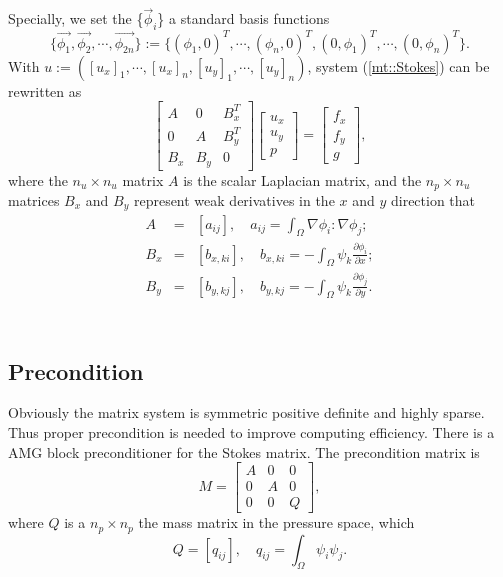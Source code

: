 \documentclass[a4paper]{article}
\begin{document}
Specially, we set the \{$\vec{\phi}_i$\} a standard basis functions
\begin{equation}
\{\vec{\phi_1},\vec{\phi_2},\cdots,\vec{\phi_{2n}} \}:=\{(\phi_1,0)^T,\cdots,(\phi_n,0)^T,(0,\phi_1)^T,\cdots,(0,\phi_n)^T\}.
\label{eq::basisfunction}
\end{equation}
With $u:=([u_x]_1,\cdots,[u_x]_n,[u_y]_1,\cdots,[u_y]_n)$, system (\ref{mt::Stokes}) can be rewritten as
\begin{equation}
\left[ \begin{array}{ccc}
A & 0 & B_x^T \\
0 & A & B_y^T \\
B_x & B_y & 0
\end{array}
\right]
\left[\begin{array}{ccc}
u_x\\
u_y\\
p
\end{array}
\right]=
\left[\begin{array}{ccc}
f_x\\
f_y\\
g
\end{array}
\right],
\label{Stokes}
\end{equation}
where the $n_u \times n_u $ matrix $A$ is the scalar Laplacian matrix, and the $n_p\times n_u$ matrices $B_x$ and $B_y$ represent weak derivatives in the $x$ and $y$ direction that 	
\begin{equation}
\begin{array}{rcl}
A &=& [a_{ij}], \quad a_{ij} = \int_{\Omega} \nabla \phi_i : \nabla \phi_j ;\\
B_x &=& [b_{x,ki}], \quad b_{x,ki} = -\int_{\Omega} \psi_k \frac{\partial \phi_i}{\partial x} ;\\
B_y &=& [b_{y,kj}], \quad b_{y,kj} = -\int_{\Omega} \psi_k \frac{\partial \phi_j}{\partial y} .\\
\end{array}
\label{Stokes-mtvalue}
\end{equation}
 \\
\subsection{Precondition}
Obviously the matrix system is symmetric positive definite and highly
sparse. Thus proper precondition is needed to improve computing
efficiency. There is a AMG block preconditioner for the Stokes
matrix. The precondition matrix is
\begin{equation}
M = \left[ \begin{array}{ccc}
A & 0 & 0 \\
0 & A & 0 \\
0 & 0 & Q
\end{array}
\right],
\end{equation}
where $Q$ is a $n_p\times n_p$ the mass matrix in the pressure space, which
\begin{equation}
Q = [q_{ij}], \quad q_{ij} = \int_{\Omega} \psi_i\psi_j.
\label{pr::Q}
\end{equation}
\end{document}
